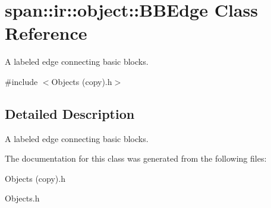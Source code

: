 \hypertarget{classspan_1_1ir_1_1object_1_1BBEdge}{}\section{span\+:\+:ir\+:\+:object\+:\+:B\+B\+Edge Class Reference}
\label{classspan_1_1ir_1_1object_1_1BBEdge}


A labeled edge connecting basic blocks.  




{\ttfamily \#include $<$Objects (copy).\+h$>$}



\subsection{Detailed Description}
A labeled edge connecting basic blocks. 

The documentation for this class was generated from the following files\+:\begin{DoxyCompactItemize}
\item 
Objects (copy).\+h\item 
Objects.\+h\end{DoxyCompactItemize}
